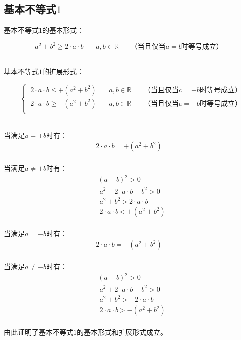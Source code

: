 \documentclass[UTF8]{ctexart}
\begin{document}
\subsection{基本不等式$1$}
    基本不等式$1$的基本形式：
    \begin{large}
        \begin{equation*}
            a^2+b^2 \geq 2\cdot a\cdot b~~~~~~~~a,b\in\mathbb{R}~~~~~~~~\text{（当且仅当$a=b$时等号成立）}
        \end{equation*}
    \end{large}\\
    基本不等式$1$的扩展形式：\vspace{3pt}
    \begin{large}
        \begin{equation*}
            ~~~~
            \begin{cases}
                ~2\cdot a\cdot b\leq+(a^2+b^2) ~~~~~~~~a,b\in\mathbb{R}~~~~~~~~\text{（当且仅当$a=+b$时等号成立）}\\[1mm]
                ~2\cdot a\cdot b\geq-(a^2+b^2)~~~~~~~~a,b\in\mathbb{R}~~~~~~~~\text{（当且仅当$a=-b$时等号成立）}\\[1mm]
            \end{cases}
        \end{equation*}
    \end{large}\\[5mm]
    当满足$a=+b$时有：
    \setcounter{equation}{0}
    \begin{align}
        2\cdot a\cdot b=+(a^2+b^2)
    \end{align}\\
    当满足$a\neq +b$时有：
    \begin{align}
        &(a-b)^2>0\\[2mm]
        &~a^2-2\cdot a\cdot b+b^2>0\\[2mm]
        &~a^2+b^2>2\cdot a\cdot b\\[2mm]
        &~2\cdot a\cdot b<+(a^2+b^2)
    \end{align}\\
    当满足$a=-b$时有：
    \begin{align}
        2\cdot a\cdot b=-(a^2+b^2)
    \end{align}\\
    当满足$a\neq -b$时有：
    \begin{align}
        &(a+b)^2>0\\[2mm]
        &~a^2+2\cdot a\cdot b+b^2>0\\[2mm]
        &~a^2+b^2>-2\cdot a\cdot b\\[2mm]
        &~2\cdot a\cdot b>-(a^2+b^2)
    \end{align}\\
    由此证明了基本不等式$1$的基本形式和扩展形式成立。
\end{document}
